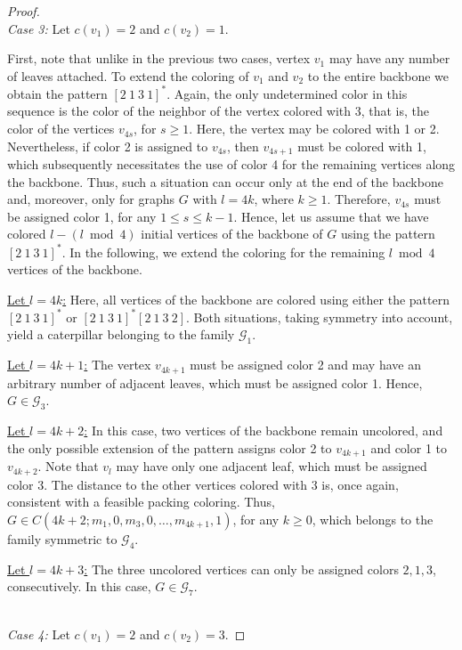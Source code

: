 \documentclass[10pt,a4paper]{amsart}
\begin{document}
\begin{proof}
~~\\
\emph{Case 3:} Let $c(v_1)=2$ and  $c(v_2)=1$. 

First, note that unlike in the previous two cases, vertex $v_1$ may have any number of leaves attached. To extend the coloring of $v_1$ and $v_2$ to the entire backbone we obtain the pattern $[2\ 1\ 3\ 1]^*$. Again, the only undetermined color in this sequence is the color of the neighbor of the vertex colored with 3, that is, the color of the vertices $v_{4s}$, for $s\geq 1$. Here, the vertex may be colored with 1 or 2. Nevertheless, if color 2 is assigned to $v_{4s}$, then $v_{4s+1}$ must be colored with 1, which subsequently necessitates the use of color 4 for the remaining vertices along the backbone. Thus, such a situation can occur only at the end of the backbone and, moreover, only for graphs $G$ with $l=4k$, where $k\geq 1$. Therefore, $v_{4s}$ must be assigned color 1, for any $ 1 \leq s\leq k -1$.
Hence, let us assume that we have colored $l - (l \bmod 4)$ initial vertices of the backbone of $G$ using the pattern $[2\ 1\ 3\ 1]^*$. In the following, we extend the coloring for the remaining $l \bmod 4$ vertices of the backbone.

\underline{Let $l=4k$:} Here, all vertices of the backbone are colored using either the pattern $[2\ 1\ 3\ 1]^*$ or $[2\ 1\ 3\ 1]^*[2\ 1\ 3\ 2]$. Both situations, taking symmetry into account, yield a caterpillar belonging to the family $\mathcal{G}_{1}$.

\underline{Let $l=4k+1$:} The vertex $v_{4k+1}$ must be assigned color 2 and may have an arbitrary number of adjacent leaves, which must be assigned color 1. Hence, $G\in \mathcal{G}_3$.

\underline{Let $l=4k+2$:} In this case, two vertices of the backbone remain uncolored, and the only possible extension of the pattern assigns color 2 to $v_{4k+1}$ and color 1 to $v_{4k+2}$. Note that $v_l$ may have only one adjacent leaf, which must be assigned color 3. The distance to the other vertices colored with 3 is, once again, consistent with a feasible packing coloring. Thus, $G \in C(4k+2; m_1, 0, m_3, 0, \ldots, m_{4k+1}, 1)$, for any $k\geq 0$, which belongs to the family symmetric to $\mathcal{G}_4$. 

\underline{Let $l=4k+3$:} The three uncolored vertices can only be assigned colors $2, 1, 3$, consecutively. In this case, $G\in \mathcal{G}_7$.

~~\\
\emph{Case 4:} Let $c(v_1)=2$ and $c(v_2)=3$. 


\end{proof}
\end{document}
